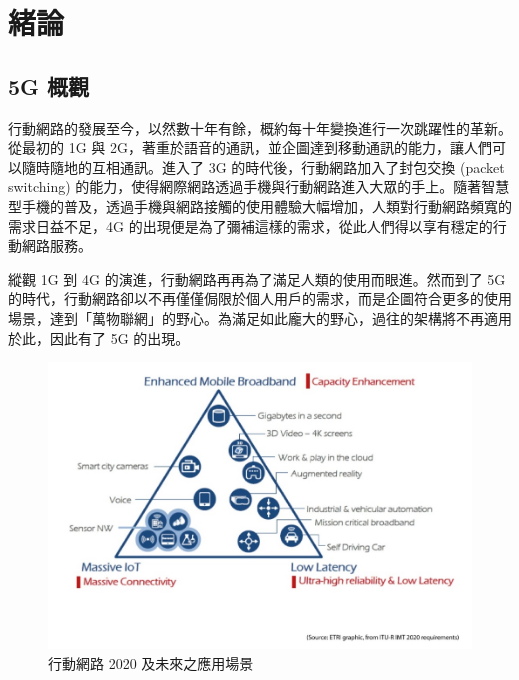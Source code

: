 \chapter{緒論}
\label{chapter:intro}


\section{5G 概觀}
\label{sec:5g_intro}

行動網路的發展至今，以然數十年有餘，概約每十年變換進行一次跳躍性的革新。從最初的 1G 與 2G，著重於語音的通訊，並企圖達到移動通訊的能力，讓人們可以隨時隨地的互相通訊。進入了 3G 的時代後，行動網路加入了封包交換 (packet switching) 的能力，使得網際網路透過手機與行動網路進入大眾的手上。隨著智慧型手機的普及，透過手機與網路接觸的使用體驗大幅增加，人類對行動網路頻寬的需求日益不足，4G 的出現便是為了彌補這樣的需求，從此人們得以享有穩定的行動網路服務。

縱觀 1G 到 4G 的演進，行動網路再再為了滿足人類的使用而眼進。然而到了 5G 的時代，行動網路卻以不再僅僅侷限於個人用戶的需求，而是企圖符合更多的使用場景，達到「萬物聯網」的野心。為滿足如此龐大的野心，過往的架構將不再適用於此，因此有了 5G 的出現。

\begin{figure}[htbp]
    \centering
    \includegraphics[height=!,width=0.8\linewidth,keepaspectratio=true]{figures/usage_scenarios_of_IMT_for_2020}
    \caption[行動網路 2020 及未來之應用場景]{{\footnotesize 行動網路 2020 及未來之應用場景~\cite{IMT_2020}}}
    \label{fig:IMT_2020}
\end{figure}


